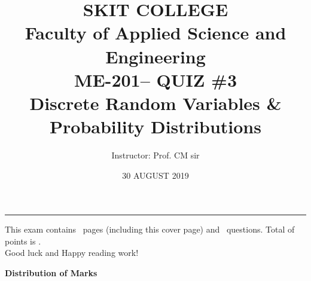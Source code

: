 \documentclass[letterpaper,12pt,addpoints]{exam}
\newcommand{\university}{SKIT COLLEGE }
\newcommand{\faculty}{Faculty of Applied Science and Engineering}
\newcommand{\class}{ME-201}
\newcommand{\examnum}{QUIZ \#3}
\newcommand{\content}{Discrete Random Variables \& Probability Distributions}
\newcommand{\examdate}{30 AUGUST 2019}
\begin{document}
\title{\Large \textbf{\university\\ \faculty\\
\bigskip
\class -- \examnum \\ \content}}
\author{Instructor: Prof. CM sir}
\date{\examdate}
\maketitle
\begin{flushleft}
\medskip
{}
\end{flushleft}
\noindent \rule{\textwidth}{1pt}

\noindent This exam contains \numpages\ pages (including this cover page) and \numquestions\ questions. Total of points is \numpoints.\\
Good luck and Happy reading work!

\begin{center}
\textbf{Distribution of Marks}\\
\medskip
\gradetable[v][questions]
\end{center}
\end{document}
